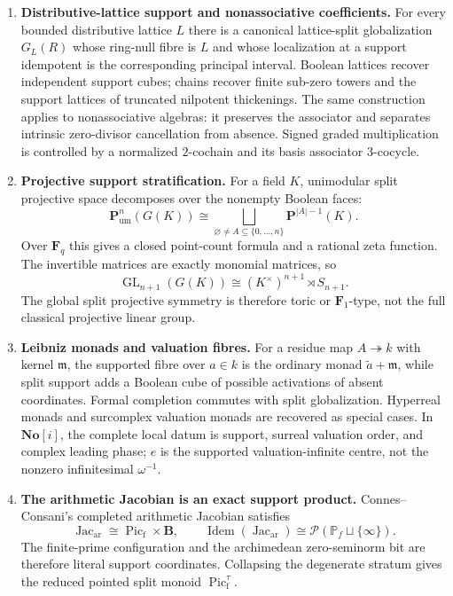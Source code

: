 \documentclass[11pt]{amsart}
\numberwithin{equation}{section}
\theoremstyle{definition}
\newcommand{\B}{\mathbf B}
\newcommand{\F}{\mathbf F}
\newcommand{\Fone}{\mathbf F_1}
\newcommand{\No}{\mathbf{No}}
\newcommand{\GL}{\operatorname{GL}}
\newcommand{\Pum}{\mathbf P_{\mathrm{um}}}
\newcommand{\Picf}{\operatorname{Pic}_{\mathrm f}}
\newcommand{\Jacar}{\operatorname{Jac}_{\mathrm{ar}}}
\newcommand{\Idem}{\operatorname{Idem}}
\begin{document}
\begin{enumerate}[label=\textup{(\arabic*)},leftmargin=3.2em]
\item \textbf{Distributive-lattice support and nonassociative coefficients.}
For every bounded distributive lattice $L$ there is a canonical
lattice-split globalization $G_L(R)$ whose ring-null fibre is $L$ and whose
localization at a support idempotent is the corresponding principal
interval.  Boolean lattices recover independent support cubes; chains
recover finite sub-zero towers and the support lattices of truncated
nilpotent thickenings.  The same construction applies to nonassociative
algebras: it preserves the associator and separates intrinsic zero-divisor
cancellation from absence.  Signed graded multiplication is controlled by
a normalized $2$-cochain and its basis associator $3$-cocycle.

\item \textbf{Projective support stratification.}
For a field $K$, unimodular split projective space decomposes over the
nonempty Boolean faces:
\[
\Pum^n(G(K))
\cong
\bigsqcup_{\varnothing\neq A\subseteq\{0,\dots,n\}}
\mathbf P^{|A|-1}(K).
\]
Over $\F_q$ this gives a closed point-count formula and a rational zeta
function.  The invertible matrices are exactly monomial matrices, so
\[
\GL_{n+1}(G(K))\cong(K^\times)^{n+1}\rtimes S_{n+1}.
\]
The global split projective symmetry is therefore toric or $\Fone$-type,
not the full classical projective linear group.

\item \textbf{Leibniz monads and valuation fibres.}
For a residue map $A\twoheadrightarrow k$ with kernel $\mathfrak m$, the
supported fibre over $a\in k$ is the ordinary monad
$\widetilde a+\mathfrak m$, while split support adds a Boolean cube of
possible activations of absent coordinates.  Formal completion commutes
with split globalization.  Hyperreal monads and surcomplex valuation
monads are recovered as special cases.  In $\No[i]$, the complete local
datum is support, surreal valuation order, and complex leading phase;
$e$ is the supported valuation-infinite centre, not the nonzero
infinitesimal $\omega^{-1}$.

\item \textbf{The arithmetic Jacobian is an exact support product.}
Connes--Consani's completed arithmetic Jacobian satisfies
\[
\Jacar\cong\Picf\times\B,
\qquad
\Idem(\Jacar)\cong
\mathcal P(\mathbb P_f\sqcup\{\infty\}).
\]
The finite-prime configuration and the archimedean zero-seminorm bit are
therefore literal support coordinates.  Collapsing the degenerate stratum
gives the reduced pointed split monoid $\Picf^\tau$.


\end{enumerate}
\end{document}
